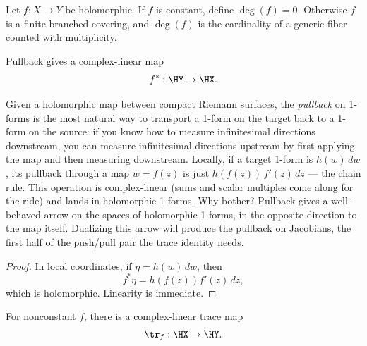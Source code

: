 Let \(f:X\to Y\) be holomorphic. If \(f\) is constant, define
\(\deg(f)=0\). Otherwise \(f\) is a finite branched covering, and
\(\deg(f)\) is the cardinality of a generic fiber counted with multiplicity.

\begin{lemma}
\label{lem:pullback-forms}

Pullback gives a complex-linear map
\[
  f^{*}:\HY\to\HX.
\]
\leanok
\end{lemma}

\begin{layman}
Given a holomorphic map between compact Riemann surfaces, the
\emph{pullback} on 1-forms is the most natural way to transport a
1-form on the target back to a 1-form on the source: if you know how
to measure infinitesimal directions downstream, you can measure
infinitesimal directions upstream by first applying the map and then
measuring downstream. Locally, if a target 1-form is \(h(w)\,dw\), its
pullback through a map \(w = f(z)\) is just \(h(f(z))\,f'(z)\,dz\) ---
the chain rule. This operation is complex-linear (sums and scalar
multiples come along for the ride) and lands in holomorphic
1-forms. Why bother? Pullback gives a well-behaved arrow on the spaces
of holomorphic 1-forms, in the opposite direction to the map itself.
Dualizing this arrow will produce the pullback on Jacobians, the first
half of the push/pull pair the trace identity needs.
\end{layman}

\begin{proof}
\leanok
In local coordinates, if \(\eta=h(w)\,dw\), then
\[
  f^{*}\eta = h(f(z))f'(z)\,dz,
\]
which is holomorphic. Linearity is immediate.
\end{proof}
\begin{lemma}
\label{lem:trace-forms}

For nonconstant \(f\), there is a complex-linear trace map
\[
  \tr_f:\HX\to\HY.
\]
\leanok
\end{lemma}



